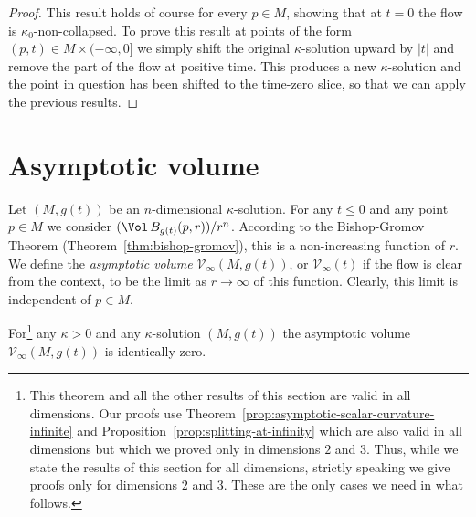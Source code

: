\begin{proof}
This result holds of course for every $p\in M$, showing that at
$t=0$ the flow is $\kappa_0$-non-collapsed. To prove this result at
points of the form $(p,t)\in M\times(-\infty,0]$ we simply shift the
original $\kappa$-solution upward by $|t|$ and remove the part of
the flow at positive time. This produces a new $\kappa$-solution and
the point in question has been shifted to the time-zero slice, so
that we can apply the previous results.
\end{proof}



\section{Asymptotic volume}

Let $(M,g(t))$ be an $n$-dimensional $\kappa$-solution. For any
$t\le 0$ and any point $p\in M$ we consider $(\Vol\,B_{g(t)}(p,r))/r^n$. According to the Bishop-Gromov Theorem
(Theorem~\ref{thm:bishop-gromov}), this is a non-increasing function of
$r$. We define the {\em asymptotic volume} ${\mathcal V}_\infty(M,g(t))$, or ${\mathcal
V}_\infty(t)$ if the flow is clear from the context, to be the limit
as $r\rightarrow\infty$ of this function. Clearly, this limit is
independent of $p\in M$.

\begin{theorem}\label{thm:asymptotic-volume-zero}
\label{asympvol}
For\footnote{This theorem and all the other results of this section are valid
in all dimensions. Our proofs use Theorem~\ref{prop:asymptotic-scalar-curvature-infinite} and
Proposition~\ref{prop:splitting-at-infinity} which are also valid in all dimensions but which we
proved only in dimensions $2$ and $3$. Thus, while we state the results of this
section for all dimensions, strictly speaking we give proofs only for
dimensions $2$ and $3$. These are the only cases we need in what follows.} any
$\kappa>0$ and any $\kappa$-solution $(M,g(t))$ the asymptotic volume
${\mathcal V}_\infty(M,g(t))$ is identically zero.
\end{theorem}


